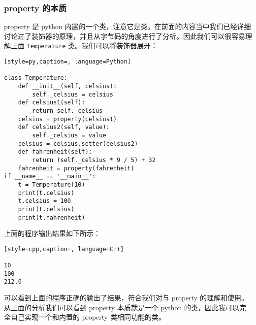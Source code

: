 \subsubsection{property 的本质}
property 是 python 内置的一个类，注意它是类。在前面的内容当中我们已经详细讨论过了装饰器的原理，并且从字节码的角度进行了分析。因此我们可以很容易理解上面 \verb|Temperature| 类。我们可以将装饰器展开：
\begin{lstlisting}[style=py,caption=, language=Python]

class Temperature:
    def __init__(self, celsius):
        self._celsius = celsius
    def celsius1(self):
        return self._celsius
    celsius = property(celsius1)
    def celsius2(self, value):
        self._celsius = value
    celsius = celsius.setter(celsius2)
    def fahrenheit(self):
        return (self._celsius * 9 / 5) + 32
    fahrenheit = property(fahrenheit)
if __name__ == '__main__':
    t = Temperature(10)
    print(t.celsius)
    t.celsius = 100
    print(t.celsius)
    print(t.fahrenheit)
\end{lstlisting}
上面的程序输出结果如下所示：
\begin{lstlisting}[style=cpp,caption=, language=C++]

10
100
212.0
\end{lstlisting}
可以看到上面的程序正确的输出了结果，符合我们对与 property 的理解和使用。从上面的分析我们可以看到 property 本质就是一个 python 的类，因此我可以完全自己实现一个和内置的 property 类相同功能的类。

